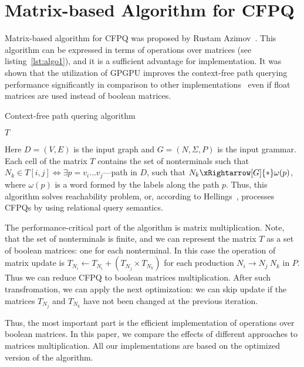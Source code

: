 \section{Matrix-based Algorithm for CFPQ}

Matrix-based algorithm for CFPQ was proposed by Rustam Azimov~\cite{Azimov:2018:CPQ:3210259.3210264}.
This algorithm can be expressed in terms of operations over matrices (see listing~\ref{lst:algo1}), and it is a sufficient advantage for implementation.
It was shown that the utilization of GPGPU improves the context-free path querying performance  significantly in comparison to other implementations~\cite{Azimov:2018:CPQ:3210259.3210264} even if float matrices are used instead of boolean matrices.

\begin{algorithm}
\begin{algorithmic}[1]
\caption{Context-free path quering algorithm}
\label{lst:algo1}

    \EndFor

    \EndWhile
\State \Return $T$
\EndFunction
\end{algorithmic}
\end{algorithm}

Here $D = (V, E)$ is the input graph and $G = (N,\Sigma,P)$ is the input grammar.
Each cell of the matrix $T$ contains the set of nonterminals such that $N_k \in T[i,j] \iff \exists p = v_i \ldots v_j $---path in $D$, such that $N_k \xRightarrow[G]{*} \omega(p) $, where $\omega(p)$ is a word formed by the labels along the path $p$.
Thus, this algorithm solves reachability problem, or, according to Hellings~\cite{hellingsRelational}, processes CFPQs by using relational query semantics.

The performance-critical part of the algorithm is matrix multiplication.
Note, that the set of nonterminals is finite, and we can represent the matrix $T$ as a set of boolean matrices: one for each nonterminal.
In this case the operation of matrix update is $T_{N_i} \leftarrow T_{N_i} + (T_{N_j} \times T_{N_k})$ for each production $N_i \rightarrow N_j \ N_k$ in $P$.
Thus we can reduce CFPQ to boolean matrices multiplication.
After such transfromation, we can apply the next optimization: we can skip update if the matrices $T_{N_j}$ and $T_{N_k}$ have not been changed at the previous iteration.

Thus, the most important part is the efficient implementation of operations over boolean matrices. 
In this paper, we compare the effects of different approaches to matrices multiplication.
All our implementations are based on the optimized version of the algorithm.
